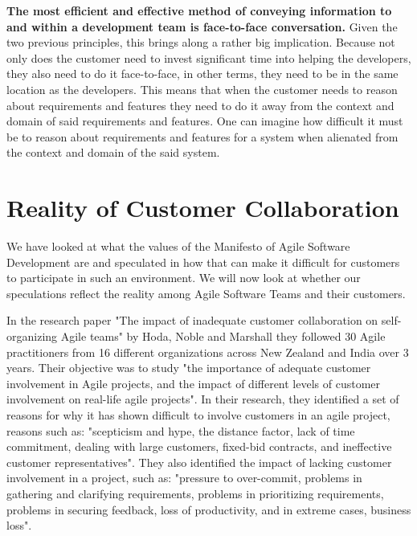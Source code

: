 \textbf{The most efficient and effective method of conveying information to and within a development team is face-to-face conversation.}
Given the two previous principles, this brings along a rather big implication.
Because not only does the customer need to invest significant time into helping the developers, they also need to do it face-to-face, in other terms, they need to be in the same location as the developers.
This means that when the customer needs to reason about requirements and features they need to do it away from the context and domain of said requirements and features.
One can imagine how difficult it must be to reason about requirements and features for a system when alienated from the context and domain of the said system. 

\section{Reality of Customer Collaboration}
We have looked at what the values of the Manifesto of Agile Software Development are and speculated in how that can make it difficult for customers to participate in such an environment.
We will now look at whether our speculations reflect the reality among Agile Software Teams and their customers.

In the research paper "The impact of inadequate customer collaboration on self-organizing Agile teams" by Hoda, Noble and Marshall \cite{Hoda2011TheIO} they followed 30 Agile practitioners from 16 different organizations across New Zealand and India over 3 years.
Their objective was to study "the importance of adequate customer involvement in Agile projects, and the impact of different levels of customer involvement on real-life agile projects".
In their research, they identified a set of reasons for why it has shown difficult to involve customers in an agile project, reasons such as: "scepticism and hype, the distance factor, lack of time commitment, dealing with large customers, fixed-bid contracts, and ineffective customer representatives".
They also identified the impact of lacking customer involvement in a project, such as: "pressure to over-commit, problems in gathering and clarifying requirements, problems in prioritizing requirements, problems in securing feedback, loss of productivity, and in extreme cases, business loss". \cite{Hoda2011TheIO}

